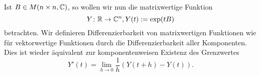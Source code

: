 Ist $B \in M(n \times n,\mathbb{C})$, so wollen wir nun die matrixwertige Funktion
\[
	Y\colon \mathbb{R} \rightarrow \mathbb{C}^{n}, Y(t) := \exp(tB)
\]
betrachten.
Wir definieren Differenzierbarkeit von matrixwertigen Funktionen wie für vektorwertige Funktionen durch die Differenzierbarkeit aller Komponenten.
Dies ist wieder äquivalent zur komponentenweisen Existenz des Grenzwertes
\[
	Y'(t) = \lim\limits_{h \rightarrow 0} \frac{1}{h}(Y(t+h)-Y(t)).
\]
\newpage